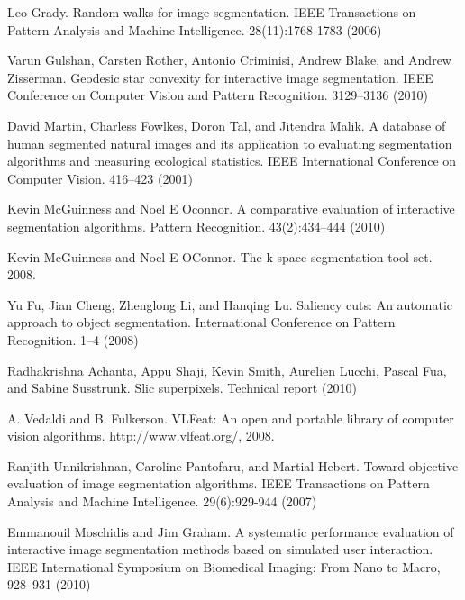 \documentclass[runningheads,a4paper]{llncs}
\begin{document}
\begin{thebibliography}{4}
 Leo Grady. Random walks for image segmentation. IEEE Transactions on Pattern Analysis and Machine Intelligence. 28(11):1768-1783 (2006)

 Varun Gulshan, Carsten Rother, Antonio Criminisi, Andrew Blake, and Andrew Zisserman. Geodesic star convexity for interactive image segmentation. IEEE Conference on Computer Vision and Pattern Recognition. 3129--3136 (2010)

 David Martin, Charless Fowlkes, Doron Tal, and Jitendra Malik. A database of human segmented natural images and its application to evaluating segmentation algorithms and measuring ecological statistics. IEEE International Conference on Computer Vision. 416--423 (2001)

 Kevin McGuinness and Noel E Oconnor. A comparative evaluation of interactive segmentation algorithms. Pattern Recognition. 43(2):434--444 (2010)

 Kevin McGuinness and Noel E OConnor. The k-space segmentation tool set. 2008.

 Yu Fu, Jian Cheng, Zhenglong Li, and Hanqing Lu. Saliency cuts: An automatic approach to object segmentation. International Conference on Pattern Recognition. 1--4 (2008)

 Radhakrishna Achanta, Appu Shaji, Kevin Smith, Aurelien Lucchi, Pascal Fua, and Sabine Susstrunk. Slic superpixels. Technical report (2010)

 A. Vedaldi and B. Fulkerson. VLFeat: An open and portable library of computer vision algorithms. http://www.vlfeat.org/, 2008.

 Ranjith Unnikrishnan, Caroline Pantofaru, and Martial Hebert. Toward objective evaluation of image segmentation algorithms. IEEE Transactions on Pattern Analysis and Machine Intelligence. 29(6):929-944 (2007)

Emmanouil Moschidis and Jim Graham. A systematic performance evaluation of interactive image segmentation methods based on simulated user interaction. IEEE International Symposium on Biomedical Imaging: From Nano to Macro, 928--931 (2010)

\end{thebibliography}
\end{document}
